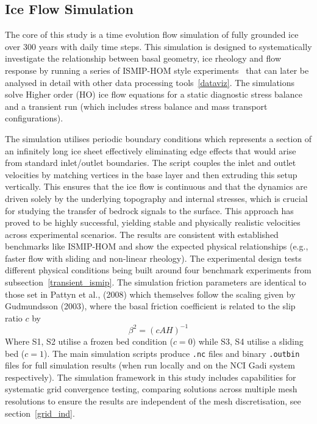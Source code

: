 \subsection{Ice Flow Simulation}
The core of this study is a time evolution flow simulation of fully grounded ice over 300 years with daily time steps. This simulation is designed to systematically investigate the relationship between basal geometry, ice rheology and flow response by running a series of ISMIP-HOM style experiments~\cite{Pattyn_2008} that can later be analysed in detail with other data processing tools~\ref{dataviz}. The simulations solve Higher order (HO) ice flow equations for a static diagnostic stress balance and a transient run (which includes stress balance and mass transport configurations).

The simulation utilises periodic boundary conditions which represents a section of an infinitely long ice sheet effectively eliminating edge effects that would arise from standard inlet/outlet boundaries. The script couples the inlet and outlet velocities by matching vertices in the base layer and then extruding this setup vertically. This ensures that the ice flow is continuous and that the dynamics are driven solely by the underlying topography and internal stresses, which is crucial for studying the transfer of bedrock signals to the surface.
This approach has proved to be highly successful, yielding stable and physically realistic velocities across experimental scenarios. The results are consistent with established benchmarks like ISMIP-HOM and show the expected physical relationships (e.g., faster flow with sliding and non-linear rheology).
The experimental design tests different physical conditions being built around four benchmark experiments from subsection~\ref{transient_ismip}.  
The simulation friction parameters are identical to those set in Pattyn et al., (2008) which themselves follow the scaling given by Gudmundsson (2003), where the basal friction coefficient is related to the slip ratio $c$ by
\begin{equation}
\beta^2 = \left (c A H\right )^{-1}
\end{equation}
Where S1, S2 utilise a frozen bed condition ($c = 0$) while S3, S4 utilise a sliding bed ($c = 1$).
The main simulation scripts produce \texttt{.nc} files and binary \texttt{.outbin} files for full simulation results (when run locally and on the NCI Gadi system respectively).
The simulation framework in this study includes capabilities for systematic grid convergence testing, comparing solutions across multiple mesh resolutions to ensure the results are independent of the mesh discretisation, see section~\ref{grid_ind}.

